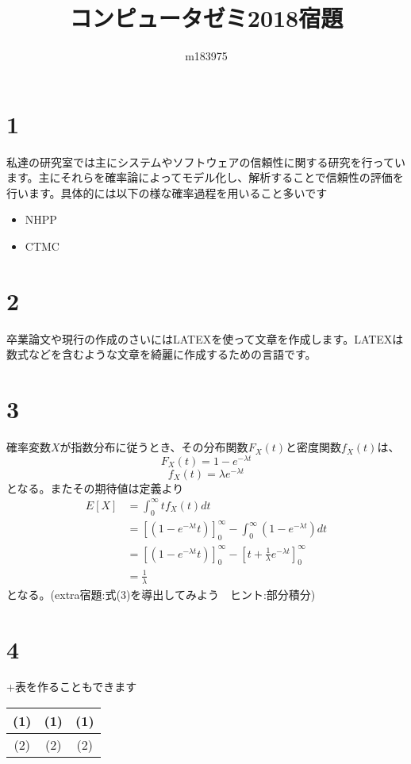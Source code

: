 \documentclass[a4paper,12pt]{article}
\title{コンピュータゼミ2018宿題}
\author{m183975}
\begin{document}
\maketitle
\section{1}
私達の研究室では主にシステムやソフトウェアの信頼性に関する研究を行っています。主にそれらを確率論によってモデル化し、解析することで信頼性の評価を行います。具体的には以下の様な確率過程を用いること多いです

\begin{itemize}
  \item NHPP
  \item CTMC
\end{itemize}
\section{2}
卒業論文や現行の作成のさいにはLATEXを使って文章を作成します。LATEXは数式などを含むような文章を綺麗に作成するための言語です。
\section{3}
確率変数$X$が指数分布に従うとき、その分布関数$F_{X}(t)$と密度関数$f_{X}(t)$は、
\begin{equation}
  F_{X}(t) = 1-e^{-{\lambda}t}
\end{equation}
\begin{equation}
  f_{X}(t) = {\lambda}e^{-{\lambda}t}
\end{equation}
となる。またその期待値は定義より
\begin{equation}
\begin{aligned}
E[X]&=\int_{0}^{\infty}tf_{X}(t)dt\\
&=[(1-e^{-{\lambda}t}t)]^\infty_{0}-\int_{0}^{\infty}(1-e^{-{\lambda}t})dt\\
&=[(1-e^{-{\lambda}t}t)]^\infty_{0}-[t+\frac{1}{\lambda}e^{-{\lambda}t}]^\infty_{0}\\
&=\frac{1}{\lambda}
\end{aligned}
\end{equation}
となる。(extra宿題:式(3)を導出してみよう　ヒント:部分積分)
\section{4}
+表を作ることもできます
\begin{table}[!hbt]  
  \centering  
\begin{tabular}{|c|c|c|}
\hline  
(1)&(1)&(1)\\
\hline  
(2)&(2)&(2)\\
\hline 
\end{tabular}
\end{table} 
\end{document}
